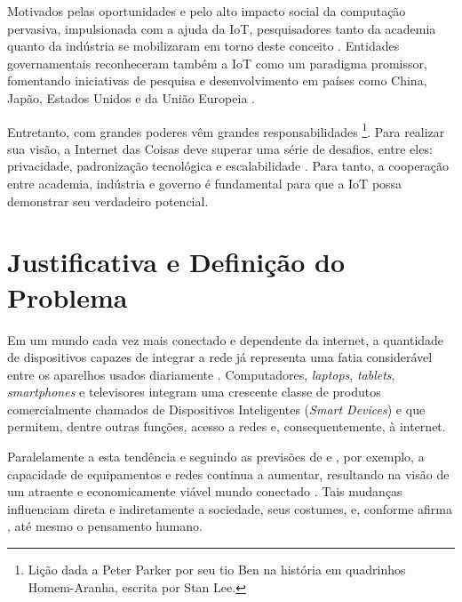 \documentclass[twoside,english,brazilian]{UNISINOSmonografia}
\begin{document}
	Motivados pelas oportunidades e pelo alto impacto social da computação 
	pervasiva, impulsionada com a ajuda da IoT, pesquisadores tanto da 
	academia quanto da indústria se mobilizaram em torno deste conceito 
	\cite{Atzori2010b}. 
	Entidades governamentais reconheceram também a IoT como um paradigma 
	promissor, fomentando iniciativas de pesquisa e desenvolvimento em países 
	como China, Japão, Estados Unidos e da União Europeia 
	\cite{Sundmaeker2010}.
	
	Entretanto, com grandes poderes vêm grandes responsabilidades
	\footnote{Lição dada a Peter Parker por seu tio Ben na história em 
	quadrinhos Homem-Aranha, escrita por Stan Lee.}. 
	Para realizar sua visão, a Internet das Coisas deve superar uma série de 
	desafios, entre eles: privacidade, padronização tecnológica e 
	escalabilidade \cite{Coetzee2011}. 
	Para tanto, a cooperação entre academia, indústria e governo é fundamental 
	para que a IoT possa demonstrar seu verdadeiro potencial.
	

\section{Justificativa e Definição do Problema}

	Em um mundo cada vez mais conectado e dependente da internet, a quantidade 
	de dispositivos capazes de integrar a rede já representa uma fatia 
	considerável entre os aparelhos usados diariamente \cite{Accenture2012}.
	Computadores, \textit{laptops}, \textit{tablets}, \textit{smartphones} e 
	televisores integram uma crescente classe de produtos comercialmente 
	chamados de Dispositivos Inteligentes (\textit{Smart Devices}) e que 
	permitem, dentre outras funções, acesso a redes e, consequentemente, à 
	internet.
	
	Paralelamente a esta tendência e seguindo as previsões de 
	 e , por exemplo, a capacidade 
	de equipamentos e redes continua a aumentar, resultando na visão de um 
	atraente e economicamente viável mundo conectado \cite{Ding2009}.
	Tais mudanças influenciam direta e indiretamente a sociedade, seus 
	costumes, e, conforme afirma , até mesmo o pensamento 
	humano.
	
\end{document}
